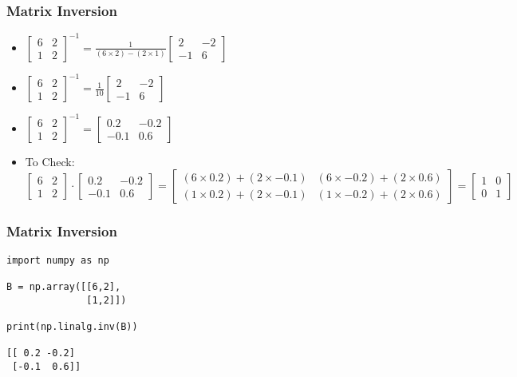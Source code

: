  \begin{frame}[fragile] \frametitle{Matrix Inversion}
\begin{itemize}
\item $\begin{bmatrix}6 & 2\\1 & 2\end{bmatrix}^{-1} = \frac{1}{(6\times2)-(2\times1)}  \begin{bmatrix}2 & -2\\-1 & 6\end{bmatrix}$
\item $\begin{bmatrix}6 & 2\\1 & 2\end{bmatrix}^{-1} = \frac{1}{10}  \begin{bmatrix}2 & -2\\-1 & 6\end{bmatrix}$
\item $\begin{bmatrix}6 & 2\\1 & 2\end{bmatrix}^{-1} = \begin{bmatrix}0.2 & -0.2\\-0.1 & 0.6\end{bmatrix}$
\item To Check:
$\begin{bmatrix}6 & 2\\1 & 2\end{bmatrix} \cdot \begin{bmatrix}0.2 & -0.2\\-0.1 & 0.6\end{bmatrix} = \begin{bmatrix}(6\times0.2)+(2\times-0.1) & (6\times-0.2)+(2\times0.6)\\(1\times0.2)+(2\times-0.1) & (1\times-0.2)+(2\times0.6)\end{bmatrix} = \begin{bmatrix}1 & 0\\0 & 1\end{bmatrix}$
\end{itemize}
\end{frame}

 \begin{frame}[fragile] \frametitle{Matrix Inversion}

\begin{lstlisting}
import numpy as np

B = np.array([[6,2],
              [1,2]])

print(np.linalg.inv(B))

[[ 0.2 -0.2]
 [-0.1  0.6]]
\end{lstlisting}

\end{frame}


